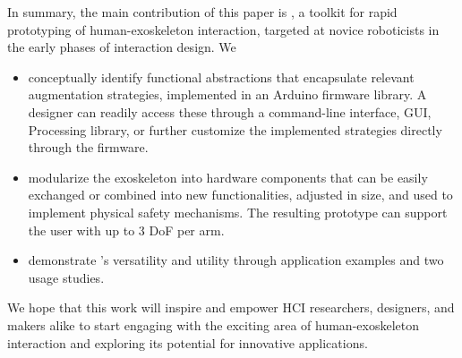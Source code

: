 In summary, the main contribution of this paper is \toolkit, a toolkit for rapid prototyping of human-exoskeleton interaction, targeted at novice roboticists in the early phases of interaction design. We
\begin{itemize}
    \item 
    conceptually identify functional abstractions that encapsulate relevant augmentation strategies, implemented in an Arduino firmware library. A designer can readily access these through a command-line interface, GUI, Processing library, or further customize the implemented strategies directly through the firmware.
    \item modularize the exoskeleton into hardware components that can be easily exchanged or combined into new functionalities, adjusted in size, and used to implement physical safety mechanisms. The resulting prototype can support the user with up to 3 DoF per arm.
    \item  demonstrate \toolkit's versatility and utility through application examples and two usage studies. 
\end{itemize}

We hope that this work will inspire and empower HCI researchers, designers, and makers alike to start engaging with the exciting area of human-exoskeleton interaction and exploring its potential for innovative applications.
